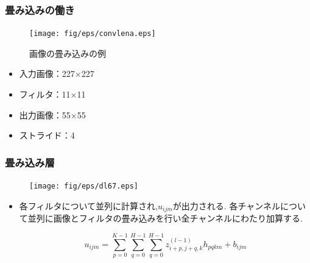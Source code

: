 \documentclass[dvipdfmx,11pt,notheorems]{beamer}
\theoremstyle{definition}
\begin{document}
\begin{frame}[fragile]\frametitle{畳み込みの働き}

\begin{figure}[t]
 \centering
 \texttt{[image: fig/eps/convlena.eps]}
  \caption{画像の畳み込みの例}
  \label{fig:画像の畳み込みの例}
\end{figure}
\begin{itemize}
 \item 入力画像：227×227
 \item フィルタ：11×11
 \item 出力画像：55×55
 \item ストライド：4
\end{itemize}

\end{frame}


\begin{frame}[fragile]\frametitle{畳み込み層}

\begin{figure}[t]
 \centering
 \texttt{[image: fig/eps/dl67.eps]}
\end{figure}

\begin{itemize}
\item 各フィルタについて並列に計算され,$u_{ijm}$が出力される.
各チャンネルについて並列に画像とフィルタの畳み込みを行い全チャンネルにわたり加算する.

\begin{equation}
  u_{ijm} = \sum_{p=0}^{K-1} \sum_{q=0}^{H-1} \sum_{q=0}^{H-1} z_{i+p,j+q,k}^{(l-1)} h_{pqkm}+b_{ijm}
\end{equation}

\end{itemize}
\end{frame}


\end{document}
